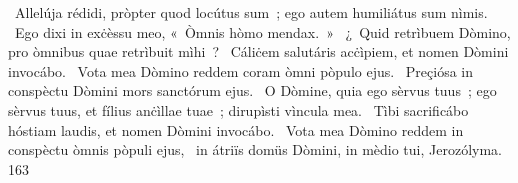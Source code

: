 {~Allelúja}
{%
rédidi, pròpter quod locútus sum~; ego autem humiliátus sum nìmis.
~Ego dixi in exċèssu meo, «~Òmnis hòmo mendax.~»
~¿~Quid retrìbuem Dòmino, pro òmnibus quae retrìbuit mìhi~?
~Cáliċem salutáris acċìpiem, et nomen Dòmini invocábo.
~Vota mea Dòmino reddem coram òmni pòpulo ejus.
~Preçiósa in conspèctu Dòmini mors sanctórum ejus.
~O Dòmine, quia ego sèrvus tuus~; ego sèrvus tuus, et fílius anċìllae tuae~; dirupìsti vìncula mea.
~Tìbi sacrificábo hóstiam laudis, et nomen Dòmini invocábo.
~Vota mea Dòmino reddem in conspèctu òmnis pòpuli ejus,
~in átriïs domüs Dòmini, in mèdio tui, Jerozólyma.
}
{16}{3}
